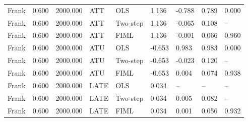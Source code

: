 \begin{table}[htbp]
\begin{tabular}{lllllllll}
Frank & 0.600 & 2000.000 & ATT & OLS & 1.136 & -0.788 & 0.789 & 0.000 \\
Frank & 0.600 & 2000.000 & ATT & Two-step & 1.136 & -0.065 & 0.108 & -- \\
Frank & 0.600 & 2000.000 & ATT & FIML & 1.136 & -0.001 & 0.066 & 0.960 \\
Frank & 0.600 & 2000.000 & ATU & OLS & -0.653 & 0.983 & 0.983 & 0.000 \\
Frank & 0.600 & 2000.000 & ATU & Two-step & -0.653 & -0.023 & 0.120 & -- \\
Frank & 0.600 & 2000.000 & ATU & FIML & -0.653 & 0.004 & 0.074 & 0.938 \\
Frank & 0.600 & 2000.000 & LATE & OLS & 0.034 & -- & -- & -- \\
Frank & 0.600 & 2000.000 & LATE & Two-step & 0.034 & 0.005 & 0.082 & -- \\
Frank & 0.600 & 2000.000 & LATE & FIML & 0.034 & 0.001 & 0.056 & 0.932 \\
\hline\end{tabular}\end{table}
